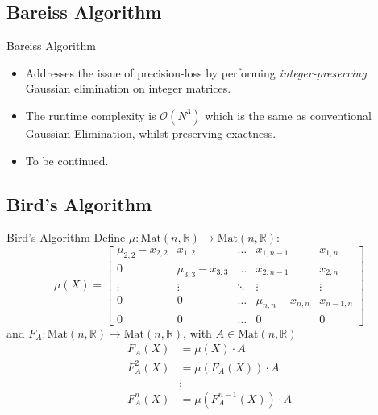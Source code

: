 \documentclass{beamer}
\begin{document}
\subsection{Bareiss Algorithm}

\begin{frame}{Bareiss Algorithm}

    \begin{itemize}

        \item Addresses the issue of precision-loss by performing \emph{integer-preserving}
            Gaussian elimination on integer matrices.

        \item The runtime complexity is $\mathcal{O}(N^3)$ which is the same as conventional
            Gaussian Elimination, whilst preserving exactness.

        \item To be continued.

    \end{itemize}

\end{frame}

\subsection{Bird's Algorithm}

\begin{frame}{Bird's Algorithm}
    Define $\mu : \mathrm{Mat}(n, \mathbb{R}) \to \mathrm{Mat}(n, \mathbb{R})$:
    \[
        \mu(X) =
        \begin{bmatrix}{}
            \mu_{2,2} - x_{2,2} & x_{1,2}             & \ldots & x_{1,n-1}           & x_{1,n} \\
            0                   & \mu_{3,3} - x_{3,3} & \ldots & x_{2,n-1}           & x_{2,n} \\
            \vdots              & \vdots              & \ddots & \vdots              & \vdots \\
            0                   & 0                   & \ldots & \mu_{n,n} - x_{n,n} & x_{n-1,n} \\
            0                   & 0                   & \ldots & 0                   & 0
        \end{bmatrix}
    \]
    and $F_A : \mathrm{Mat}(n, \mathbb{R}) \to \mathrm{Mat}(n, \mathbb{R})$, with $A \in \mathrm{Mat}(n, \mathbb{R})$
    \begin{align*}{}
        F_A(X)    & = \mu(X)\cdot A \\
        F_A^2(X)  & = \mu(F_A(X)) \cdot A \\
                  & \vdots \\
        F_A^n(X)  & = \mu(F_A^{n-1}(X)) \cdot A \\
    \end{align*}

\end{frame}
\end{document}
